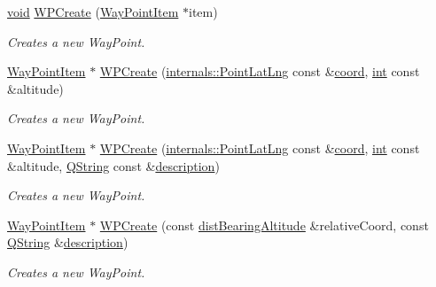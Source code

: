 \begin{DoxyCompactItemize}
\hyperlink{group___u_a_v_objects_plugin_ga444cf2ff3f0ecbe028adce838d373f5c}{void} \hyperlink{group___o_p_map_widget_gaf4409d0e8417e7cce528af31cef4dfe4}{W\-P\-Create} (\hyperlink{classmapcontrol_1_1_way_point_item}{Way\-Point\-Item} $\ast$item)
\begin{DoxyCompactList}\small\item\em Creates a new Way\-Point. \end{DoxyCompactList}\item 
\hyperlink{classmapcontrol_1_1_way_point_item}{Way\-Point\-Item} $\ast$ \hyperlink{group___o_p_map_widget_gac17ec2fbbcf0065570ad8d8568729521}{W\-P\-Create} (\hyperlink{structinternals_1_1_point_lat_lng}{internals\-::\-Point\-Lat\-Lng} const \&\hyperlink{glext_8h_a4ad6f000813afde2b5727cbfdddc75be}{coord}, \hyperlink{ioapi_8h_a787fa3cf048117ba7123753c1e74fcd6}{int} const \&altitude)
\begin{DoxyCompactList}\small\item\em Creates a new Way\-Point. \end{DoxyCompactList}\item 
\hyperlink{classmapcontrol_1_1_way_point_item}{Way\-Point\-Item} $\ast$ \hyperlink{group___o_p_map_widget_gae95af6f438774b8cddf4b8b4d670483c}{W\-P\-Create} (\hyperlink{structinternals_1_1_point_lat_lng}{internals\-::\-Point\-Lat\-Lng} const \&\hyperlink{glext_8h_a4ad6f000813afde2b5727cbfdddc75be}{coord}, \hyperlink{ioapi_8h_a787fa3cf048117ba7123753c1e74fcd6}{int} const \&altitude, \hyperlink{group___u_a_v_objects_plugin_gab9d252f49c333c94a72f97ce3105a32d}{Q\-String} const \&\hyperlink{sdlgamepad_8dox_ae82208d022e4246ddf1e4f481a3f81b0}{description})
\begin{DoxyCompactList}\small\item\em Creates a new Way\-Point. \end{DoxyCompactList}\item 
\hyperlink{classmapcontrol_1_1_way_point_item}{Way\-Point\-Item} $\ast$ \hyperlink{group___o_p_map_widget_ga950bec7a5d536f5adeddf3f2db2ee98f}{W\-P\-Create} (const \hyperlink{structmapcontrol_1_1dist_bearing_altitude}{dist\-Bearing\-Altitude} \&relative\-Coord, const \hyperlink{group___u_a_v_objects_plugin_gab9d252f49c333c94a72f97ce3105a32d}{Q\-String} \&\hyperlink{sdlgamepad_8dox_ae82208d022e4246ddf1e4f481a3f81b0}{description})
\begin{DoxyCompactList}\small\item\em Creates a new Way\-Point. \end{DoxyCompactList}\item 

\end{DoxyCompactItemize}

